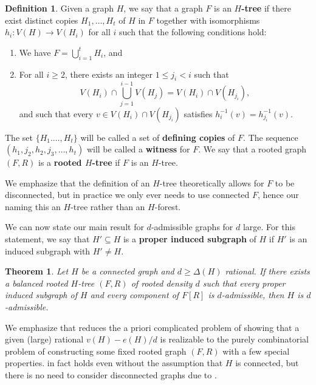 \documentclass[12pt,letterpaper]{article}
\newtheorem{theorem}{Theorem}[section]
\theoremstyle{definition}
\newtheorem{definition}{Definition}
\newcommand{\sub}{\subseteq}
\begin{document}
	\begin{definition}\label{definition H-tree}
		Given a graph $H$, we say that a graph $F$ is an \textbf{$H$-tree} if there exist distinct copies $H_1,\ldots,H_t$ of $H$ in $F$ together with isomorphisms $h_i:V(H)\to V(H_i)$ for all $i$ such that the following conditions hold:
		\begin{enumerate}[label=(\Alph*)]
			\item We have $F=\bigcup_{i=1}^t H_i$, and
			\item For all $i\ge 2$, there exists an integer $1\le j_i<i$ such that 
			\[V(H_i)\cap \bigcup_{j=1}^{i-1} V(H_j)=V(H_i)\cap V(H_{j_i}),\]
			and such that every $v\in V(H_i)\cap V(H_{j_i})$ satisfies $h^{-1}_i(v)=h^{-1}_{j_i}(v)$.
		\end{enumerate}
		The set $\{H_1.\ldots,H_t\}$ will be called a set of \textbf{defining copies} of $F$.  The sequence $(h_1,j_2,h_2,j_3,\dots,h_t)$ will be called a \textbf{witness} for $F$.  We say that a rooted graph $(F,R)$ is a \textbf{rooted $H$-tree} if $F$ is an $H$-tree.
	\end{definition}
	We emphasize that the definition of an $H$-tree theoretically allows for $F$ to be disconnected, but in practice we only ever needs to use connected $F$, hence our naming this an $H$-tree rather than an $H$-forest.
	
	We can now state our main result for $d$-admissible graphs for $d$ large.  For this statement, we say that $H'\sub H$ is a \textbf{proper induced subgraph} of $H$ if $H'$ is an induced subgraph with $H'\ne H$.
	
	
	\begin{theorem}\label{theorem d large tree implies dadmissible}
		Let $H$ be a connected graph and $d\geq \Delta(H)$ rational. If there exists a balanced rooted $H$-tree $(F,R)$ of rooted density $d$ such that every proper induced subgraph of $H$ and every component of $F[R]$ is $d$-admissible, then $H$ is $d$-admissible.
	\end{theorem}
	We emphasize that  reduces the a priori complicated problem of showing that a given (large) rational $v(H)-e(H)/d$ is realizable to the purely combinatorial problem of constructing some fixed rooted graph $(F,R)$ with a few special properties.   in fact holds even without the assumption that $H$ is connected, but there is no need to consider disconnected graphs due to .
	
\end{document}
